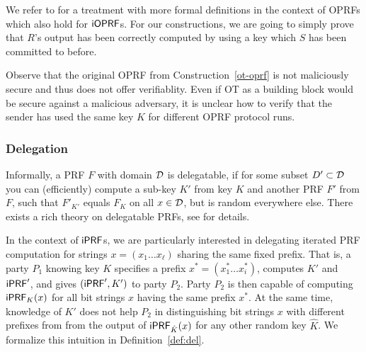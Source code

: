 We refer to \cite{kia} for a treatment with more formal definitions in
the context of OPRFs which also hold for $\mathsf{i}\mathsf{OPRF}$s.  For our
constructions, we are going to simply prove that $R$'s output has been
correctly computed by using a key which $S$ has been committed to
before.

Observe that the original OPRF from Construction~\ref{ot-oprf} is not
maliciously secure and thus does not offer verifiablity. Even if OT as
a building block would be secure against a malicious adversary, it is
unclear how to verify that the sender has used the same key $K$ for
different OPRF protocol runs.

\subsubsection{Delegation}
Informally, a PRF $F$ with domain ${\mathcal{D}}$ is delegatable, if for some
subset $D'\subset{\mathcal{D}}$ you can (efficiently) compute a sub-key $K'$ from
key $K$ and another PRF $F'$ from $F$, such that $F'_{K'}$ equals
$F_K$ on all $x\in{\mathcal{D}}$, but is random everywhere else. There exists a
rich theory on delegatable PRFs, see \citet{delegate} for details.

In the context of $\mathsf{i}\mathsf{PRF}$s, we are particularly interested in
delegating iterated PRF computation for strings
$x=(x_1\ldots{}x_\ell)$ sharing the same fixed prefix. That is, a
party $P_1$ knowing key $K$ specifies a prefix
$x^*=(x^*_1\ldots{}x^*_i)$, computes $K'$ and $\mathsf{i}\mathsf{PRF}'$, and gives
$(\mathsf{i}\mathsf{PRF}',K')$ to party $P_2$. Party $P_2$ is then capable of computing
$\mathsf{i}\mathsf{PRF}_K(x)$ for all bit strings $x$ having the same prefix $x^*$. At
the same time, knowledge of $K'$ does not help $P_2$ in
distinguishing bit strings $x$ with different prefixes from from the
output of $\mathsf{i}\mathsf{PRF}_{\hat{K}}(x)$ for any other random key $\hat{K}$.  We
formalize this intuition in Definition~\ref{def:del}.

